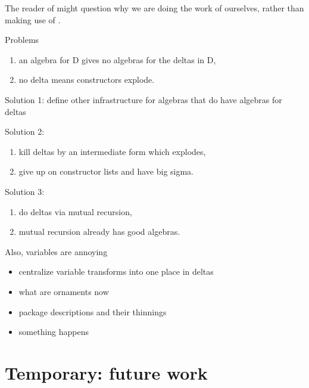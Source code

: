 The reader of \cite{algorn} might question why we are doing the work of  ourselves, rather than making use of .
\begin{remark}
Problems
\begin{enumerate}
    \item an algebra for D gives no algebras for the deltas in D,
    \item no delta means constructors explode.
\end{enumerate}

Solution 1: define other infrastructure for algebras that do have algebras for deltas

Solution 2:
\begin{enumerate}
    \item kill deltas by an intermediate form which explodes,
    \item give up on constructor lists and have big sigma.
\end{enumerate}

Solution 3:
\begin{enumerate}
    \item do deltas via mutual recursion,
    \item mutual recursion already has good algebras.
\end{enumerate}

\end{remark} 

\begin{remark}
    Also, variables are annoying
    \begin{itemize}
        \item centralize variable transforms into one place in deltas
        \item what are ornaments now
    \end{itemize} 

    \begin{itemize}
        \item package descriptions and their thinnings
        \item something happens
    \end{itemize}
\end{remark}



\section{Temporary: future work}

